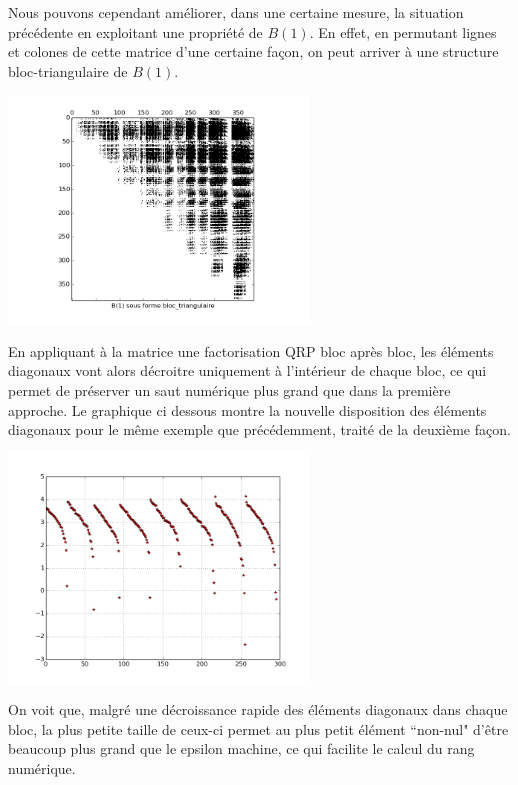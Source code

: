 \documentclass{standalone}
\begin{document}
Nous pouvons cependant améliorer, dans une certaine mesure, la situation précédente en exploitant une propriété de $B(1)$. En effet, en permutant lignes et colones de cette matrice d'une certaine façon, on peut arriver à une structure bloc-triangulaire de $B(1)$.
\begin{center}
\includegraphics[width=8cm]{../png/beztri.png}
\end{center}
En appliquant à la matrice une factorisation QRP bloc après bloc, les éléments diagonaux vont alors décroitre uniquement à l'intérieur de chaque bloc, ce qui permet de préserver un saut numérique plus grand que dans la première approche. Le graphique ci dessous montre la nouvelle disposition des éléments diagonaux pour le même exemple que précédemment, traité de la deuxième façon.
\begin{center}
\includegraphics[width=8cm]{../png/diagRtri.png}
\end{center}
On voit que, malgré une décroissance rapide des éléments diagonaux dans chaque bloc, la plus petite taille de ceux-ci permet au plus petit élément ``non-nul" d'être beaucoup plus grand que le epsilon machine, ce qui facilite le calcul du rang numérique.
\end{document}
